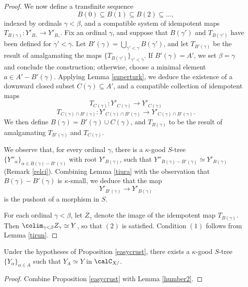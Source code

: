 \begin{CategoryTheory}
\begin{Didn't Read}
\begin{proof}
We now define a transfinite sequence
$$ B(0) \subseteq B(1) \subseteq B(2) \subseteq \ldots, $$
indexed by ordinals $\gamma < \beta$, and a compatible system of idempotent maps $T_{B(\gamma)}: Y'_{B_\gamma} \rightarrow Y'_{B_{\gamma}}.$
Fix an ordinal $\gamma$, and suppose that $B(\gamma')$ and $T_{B(\gamma')}$ have been defined for $\gamma' < \gamma$. Let $B'(\gamma) = \bigcup_{ \gamma' < \gamma} B(\gamma')$, and let $T_{B'(\gamma)}$ be the result of amalgamating the maps $\{ T_{B(\gamma')} \}_{\gamma' < \gamma}$. If $B'(\gamma) = A'$, we set $\beta = \gamma$ and conclude the construction; otherwise, choose a minimal element $a \in A' - B'(\gamma)$. Applying Lemma \ref{superturk}, we deduce the existence of a downward closed subset $C(\gamma) \subseteq A'$, and a compatible collection of idempotent maps 
$$ T_{C(\gamma)} : Y'_{C(\gamma)} \rightarrow Y'_{C(\gamma)} $$
$$ T_{C(\gamma) \cap B'(\gamma)}: Y'_{C(\gamma) \cap B'(\gamma)} \rightarrow Y'_{C(\gamma) \cap B'(\gamma)}.$$
We then define $B(\gamma) = B'(\gamma) \cup C(\gamma)$, and
$T_{B(\gamma)}$ to be the result of amalgamating $T_{B'(\gamma)}$ and $T_{C(\gamma)}$. 

We observe that, for every ordinal $\gamma$, there is a $\kappa$-good $S$-tree 
$\{ Y''_{\alpha} \}_{ \alpha \in B(\gamma) - B'(\gamma)}$
with root $Y'_{B(\gamma)}$, such that $Y''_{B(\gamma)-B'(\gamma)} \simeq Y'_{B(\gamma)}$ (Remark \ref{relci}). Combining Lemma \ref{tiura} with the observation that 
$B(\gamma)-B'(\gamma)$ is $\kappa$-small, we deduce that the map
$$ Y'_{B'(\gamma)} \rightarrow Y'_{B(\gamma)}$$ is the pushout of a morphism in $S$.

For each ordinal $\gamma < \beta$, let $Z_{\gamma}$ denote the image of the idempotent map
$T_{B(\gamma)}$. Then $\colim_{\gamma < \beta} Z_{\gamma} \simeq Y$, so that $(2)$ is satisfied. Condition $(1)$ follows from Lemma \ref{tirun}.
\end{proof}

\begin{corollary}\label{unitape}
Under the hypotheses of Proposition \ref{easycrust}, there exists a $\kappa$-good
$S$-tree $\{ Y_{\alpha} \}_{\alpha \in A}$ such that $Y_{A} \simeq Y$ in $\calC_{X/}$.
\end{corollary}

\begin{proof}
Combine Proposition \ref{easycrust} with Lemma \ref{humber2}.
\end{proof}
\end{Didn't Read}
\end{CategoryTheory}

